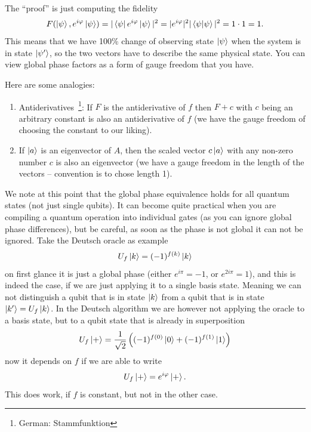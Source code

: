 The ``proof'' is just computing the fidelity
\begin{align}
    F(\ket{\psi}, e^{i\varphi}\ket{\psi}) = |\bra{\psi}e^{i\varphi}\ket{\psi}|^2 = |e^{i\varphi}|^2|\braket{\psi}{\psi}|^2 = 1 \cdot 1 = 1.
\end{align}
This means that we have 100\% change of observing state $\ket{\psi}$ when the system is in state $\ket{\psi'}$, so the two vectors have to describe the same physical state. You can view global phase factors as a form of gauge freedom that you have.

Here are some analogies:
\begin{enumerate}
    \item Antiderivatives~\footnote{German: Stammfunktion}: If $F$ is the antiderivative of $f$ then $F+c$ with $c$ being an arbitrary constant is also an antiderivative of $f$ (we have the gauge freedom of choosing the constant to our liking). 
    \item If $\ket{a}$ is an eigenvector of $A$, then the scaled vector $c\ket{a}$ with any non-zero number $c$ is also an eigenvector (we have a gauge freedom in the length of the vectors -- convention is to chose length 1).
\end{enumerate}

We note at this point that the global phase equivalence holds for all quantum states (not just single qubits). It can become quite practical when you are compiling a quantum operation into individual gates (as you can ignore global phase differences), but be careful, as soon as the phase is not global it can not be ignored. Take the Deutsch oracle as example
\begin{align}
    U_f \ket{k} = (-1)^{f(k)}\ket{k}
\end{align}
on first glance it is just a global phase (either $e^{i\pi}=-1$, or $e^{2i\pi}=1$), and this is indeed the case, if we are just applying it to a single basis state. Meaning we can not distinguish a qubit that is in state $\ket{k}$ from a qubit that is in state $\ket{k'}=U_f\ket{k}$. In the Deutsch algorithm we are however not applying the oracle to a basis state, but to a qubit state that is already in superposition
\begin{align}
    U_f \ket{+} = \frac{1}{\sqrt{2}}\left(({-1})^{f(0)}\ket{0} + ({-1})^{f(1)}\ket{1} \right)
\end{align}
now it depends on $f$ if we are able to write
\begin{align}
    U_f \ket{+} = e^{i\varphi}\ket{+}.
\end{align}
This does work, if $f$ is constant, but not in the other case. 

